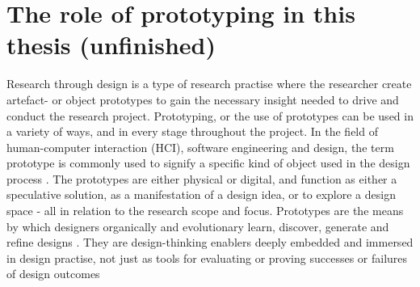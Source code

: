 

\section{The role of prototyping in this thesis (unfinished)}

Research through design is a type of research practise where the researcher create artefact- or object prototypes to gain the necessary insight needed to drive and conduct the research project. Prototyping, or the use of prototypes can be used in a variety of ways, and in every stage throughout the project. In the field of human-computer interaction (HCI), software engineering and design, the term prototype is commonly used to signify a specific kind of object used in the design process \autocite[p. 2]{lim_anatomy_2008}. The prototypes are either physical or digital, and function as either a speculative solution, as a manifestation of a design idea, or to explore a design space - all in relation to the research scope and focus. Prototypes are the means by which designers organically and evolutionary learn, discover, generate and refine designs \autocite[p. 2]{lim_anatomy_2008}. They are design-thinking enablers deeply embedded and immersed in design practise, not just as tools for evaluating or proving successes or failures of design outcomes \autocite[p. 2]{lim_anatomy_2008}


